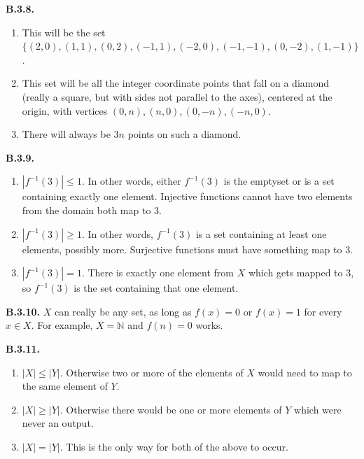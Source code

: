 \documentclass[10pt,]{book}
\theoremstyle{plain}
\theoremstyle{definition}
\theoremstyle{definition}
\theoremstyle{definition}
\theoremstyle{definition}
\numberwithin{equation}{chapter}
\def\N{\mathbb N}
\def\inv{^{-1}}
\begin{document}
%
\par\smallskip
\noindent\textbf{B.3.8.} \hypertarget{p-1726}{}%
\leavevmode%
\begin{enumerate}[label=(\alph*)]
\item\hypertarget{li-602}{}\hypertarget{p-1727}{}%
This will be the set \(\{(2,0), (1,1), (0,2), (-1,1), (-2,0), (-1,-1), (0,-2), (1,-1)\}\).%
\item\hypertarget{li-603}{}\hypertarget{p-1728}{}%
This set will be all the integer coordinate points that fall on a diamond (really a square, but with sides not parallel to the axes), centered at the origin, with vertices \((0,n), (n,0), (0,-n), (-n,0)\).%
\item\hypertarget{li-604}{}\hypertarget{p-1729}{}%
There will always be \(3n\) points on such a diamond.%
\end{enumerate}
%
\par\smallskip
\noindent\textbf{B.3.9.} \hypertarget{p-1734}{}%
\leavevmode%
\begin{enumerate}[label=(\alph*)]
\item\hypertarget{li-608}{}\hypertarget{p-1735}{}%
\(|f\inv(3)| \le 1\). In other words, either \(f\inv(3)\) is the emptyset or is a set containing exactly one element. Injective functions cannot have two elements from the domain both map to 3.%
\item\hypertarget{li-609}{}\hypertarget{p-1736}{}%
\(|f\inv(3)| \ge 1\). In other words, \(f\inv(3)\) is a set containing at least one elements, possibly more. Surjective functions must have something map to 3.%
\item\hypertarget{li-610}{}\hypertarget{p-1737}{}%
\(|f\inv(3)| = 1\). There is exactly one element from \(X\) which gets mapped to 3, so \(f\inv(3)\) is the set containing that one element.%
\end{enumerate}
%
\par\smallskip
\noindent\textbf{B.3.10.} \hypertarget{p-1739}{}%
\(X\) can really be any set, as long as \(f(x) = 0\) or \(f(x) = 1\) for every \(x \in X\). For example, \(X = \N\) and \(f(n) = 0\) works.%
\par\smallskip
\noindent\textbf{B.3.11.} \hypertarget{p-1744}{}%
\leavevmode%
\begin{enumerate}[label=(\alph*)]
\item\hypertarget{li-614}{}\hypertarget{p-1745}{}%
\(|X| \le |Y|\). Otherwise two or more of the elements of \(X\) would need to map to the same element of \(Y\).%
\item\hypertarget{li-615}{}\hypertarget{p-1746}{}%
\(|X| \ge |Y|\). Otherwise there would be one or more elements of \(Y\) which were never an output.%
\item\hypertarget{li-616}{}\hypertarget{p-1747}{}%
\(|X| = |Y|\). This is the only way for both of the above to occur.%
\end{enumerate}
\end{document}
